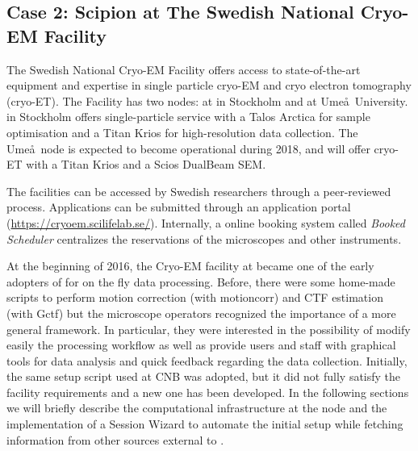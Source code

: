 
\subsection{Case 2: Scipion at The Swedish National Cryo-EM Facility}

The Swedish National Cryo-EM Facility offers access to state-of-the-art equipment and expertise in single particle cryo-EM and cryo electron tomography (cryo-ET). The Facility has two nodes: at \scilifelab in Stockholm and at Ume\aa\ University. \scilifelab in Stockholm offers single-particle service with a 
Talos Arctica for sample optimisation and a Titan Krios for high-resolution data collection. The Ume\aa\ node is expected to become operational during 2018, and will offer cryo-ET with a Titan Krios and a Scios DualBeam SEM.

The facilities can be accessed by Swedish researchers through 
a peer-reviewed process. Applications can be submitted through an application portal (\url{https://cryoem.scilifelab.se/}). %
Internally, a online booking system called \emph{Booked Scheduler} centralizes the reservations of the microscopes and other instruments. 

At the beginning of 2016, the Cryo-EM facility at \scilifelab became one of the early adopters of \scipion for on the fly data processing. Before, there were some home-made scripts to perform motion correction (with motioncorr) and CTF estimation (with Gctf) but the microscope operators recognized the importance of a more general framework. In particular, they were interested in the possibility of modify easily the processing workflow as well as provide users and staff with  graphical tools for data analysis and quick feedback regarding the data collection. Initially, the same setup script used at CNB was adopted, but it did not fully satisfy the facility requirements and a new one has been developed. In the following sections we will briefly describe the computational infrastructure at the \scilifelab node and the implementation of a Session Wizard to automate the initial setup while fetching information from other sources external to \scipion. 

